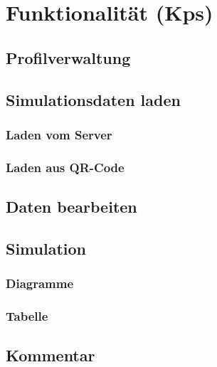 \chapter{Funktionalität (Kps)}
\label{chap:funk}

	\section{Profilverwaltung}
	\label{sec:profile}
	
	\section{Simulationsdaten laden}
	\label{sec:load-sim-data}
	
		\subsection{Laden vom Server}
		\label{subsec:load-srv}
		
		\subsection{Laden aus QR-Code}
		\label{subsec:load-qr}
		
	\section{Daten bearbeiten}
	\label{sec:edit-data}
	
	\section{Simulation}
	\label{sec:sim}
	
		\subsection{Diagramme}
		\label{subsec:diagr}
		
		\subsection{Tabelle}
		\label{subsec:table}
		
	\section{Kommentar}
	\label{sec:comment}
	
		